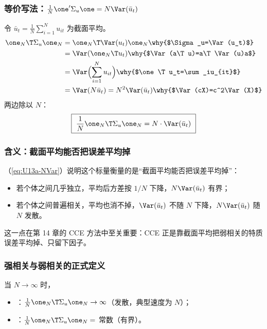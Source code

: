 \subsubsection{等价写法：\texorpdfstring{$\frac1N\one'\Sigma_u\one=N\Var(\bar u_t)$}{(1/N) 1'Sigma 1 = N Var(u-bar\_t)}}

令 $\bar u_t=\frac1N\sum_{i=1}^Nu_{it}$ 为截面平均。
\begin{align*}
\one_N\T\Sigma_u\one_N&=\one_N\T\Var(u_t)\one_N \why{$\Sigma_u=\Var(u_t)$}\\
&=\Var(\one_N\T u_t) \why{$\Var(a\T u)=a\T\Var(u)a$}\\
&=\Var\Bigl(\sum_{i=1}^Nu_{it}\Bigr) \why{$\one\T u_t=\sum_iu_{it}$}\\
&=\Var(N\bar u_t)=N^2\Var(\bar u_t) \why{$\Var(cX)=c^2\Var(X)$}
\end{align*}
两边除以 $N$：
\begin{equation}\label{eq:U13a-NVar}
\boxed{\ \frac1N\one_N\T\Sigma_u\one_N=N\cdot\Var(\bar u_t)\ }
\end{equation}

\subsubsection{含义：截面平均能否把误差平均掉}

（\ref{eq:U13a-NVar}）说明这个标量衡量的是“截面平均能否把误差平均掉”：
\begin{itemize}
\item 若个体之间几乎独立，平均后方差按 $1/N$ 下降，$N\Var(\bar u_t)$ 有界；
\item 若个体之间普遍相关，平均也消不掉，$\Var(\bar u_t)$ 不随 $N$ 下降，$N\Var(\bar u_t)$ 随 $N$ 发散。
\end{itemize}
这一点在第 14 章的 CCE 方法中至关重要：CCE 正是靠截面平均把弱相关的特质误差平均掉、只留下因子。

\subsubsection{强相关与弱相关的正式定义}

\begin{defn}\label{def:U13a-sw}
当 $N\to\infty$ 时，
\begin{itemize}
\item {}：$\frac1N\one_N\T\Sigma_u\one_N\to\infty$（发散，典型速度为 $N$）；
\item {}：$\frac1N\one_N\T\Sigma_u\one_N=$ 常数（有界）。
\end{itemize}
\end{defn}

